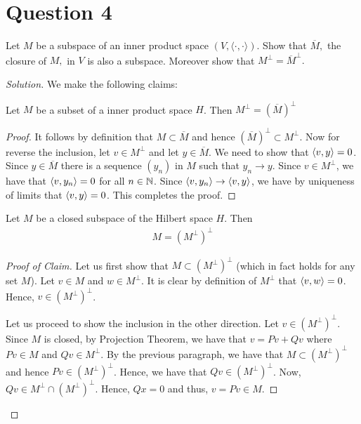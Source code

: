 \section{Question 4}
\horz
Let $M$ be a subspace of an inner product space $(V,\langle \cdot, \cdot \rangle).$ Show that $\overline{M},$ the closure of $M,$ in $V$ is also a subspace. Moreover show that $M^{\perp}= {\overline{M}}^{\perp}.$
\horz
\begin{proof}[Solution] We make the following claims:

\begin{claim}
    Let $M$ be a subset of a inner product space $H$. Then $M^{\perp} =  \left( \overline{M} \right)^{\perp}$
\end{claim}
\begin{proof}
    It follows by definition that $M \subset \overline M$ and hence $\left( \overline M \right)^{\perp} \subset M^{\perp}$. Now for reverse the inclusion, let $v \in M^{\perp}$ and let $y \in \overline M$. We need to show that $\left\langle v,y \right\rangle = 0$. Since $y\in \overline M$ there is a sequence $\left( y_{n} \right)$ in $M$ such that $y_{n} \to y$. Since $v \in M^{\perp}$, we have that $\left\langle v , y_{n} \right\rangle=0 $ for all $n\in \mathbb N$. Since $\left\langle v, y_{n} \right\rangle \to \left\langle v,y \right\rangle$, we have by uniqueness of limits that $\left\langle v,y \right\rangle = 0$. This completes the proof.
\end{proof}

\begin{claim}
    Let $M$ be a closed subspace of the Hilbert space $H$. Then 
    \begin{align*}
	M = \left( M^{\perp} \right) ^{\perp}
    \end{align*}
\end{claim}
\begin{proof}[Proof of Claim]
    Let us first show that $M \subset \left( M ^{\perp} \right)^{\perp}$ (which in fact holds for any set $M$). Let $v \in M$ and $w \in M^{\perp}$. It is clear by definition of $M^{\perp}$ that $\left\langle v,w \right\rangle = 0$. Hence, $v \in \left( M^{\perp} \right)^{\perp}$.

    Let us proceed to show the inclusion in the other direction. Let $v \in \left( M^{\perp} \right)^{\perp}$. Since $M$ is closed, by Projection Theorem, we have that $v = Pv + Qv$ where $Pv \in M$ and $Qv \in M^{\perp}$. By the previous paragraph, we have that $M \subset \left( M^{\perp} \right)^{\perp}$ and hence $Pv \in \left( M^{\perp} \right) ^{\perp}$. Hence, we have that $Qv \in \left( M^{\perp} \right)^{\perp}$. Now, $Qv \in M^{\perp} \cap \left( M^{\perp} \right) ^{\perp}$. Hence, $Qx = 0$ and thus, $v=Pv \in M$.
\end{proof}


\end{proof}
